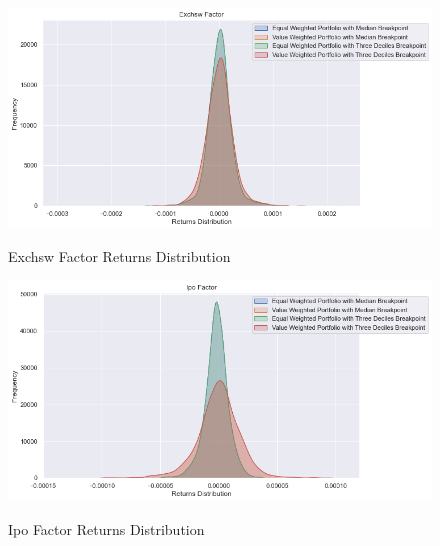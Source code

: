 \begin{figure}[H]
	\caption{Exchsw Factor Returns Distribution}
	\centering
	\includegraphics[scale=.63]{../../output/figures/exchsw.png}
	\label{fig:exchsw}
\end{figure}

\begin{figure}[H]
	\caption{Ipo Factor Returns Distribution}
	\centering
	\includegraphics[scale=.63]{../../output/figures/ipo.png}
	\label{fig:ipo}
\end{figure}





%






